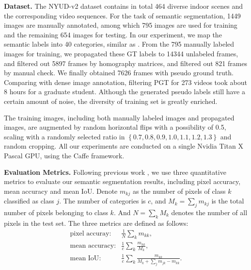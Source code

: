 \noindent\textbf{Dataset.}  
The NYUD-v2 dataset contains in total 464 diverse indoor scenes and the corresponding video sequences. 
%
For the task of semantic segmentation, 1449 images are manually annotated, among which 795 images are used for training and the remaining 654 images for testing.
%
In our experiment, we map the semantic labels into 40 categories, similar as \cite{Gupta2014}.
%
From the 795 manually labeled images for training, we propagated these GT labels to 14344 unlabeled frames, and filtered out 5897 frames by homography matrices, and filtered out 821 frames by manual check. 
We finally obtained 7626 frames with pseudo ground truth. 
%
Comparing with dense image annotation, filtering PGT for 273 videos took about 8 hours for a graduate student.
%
Although the generated pseudo labels still have a certain amount of noise, the diversity of training set is greatly enriched. 



The training images, including both manually labeled images and propagated images, are augmented by random horizontal flips with a possibility of 0.5, scaling with a randomly selected ratio in $\left\{0.7,0.8,0.9,1.0,1.1,1.2,1.3\right\}$ and random cropping. 
%
All our experiments are conducted on a single Nvidia Titan X Pascal GPU, using the Caffe framework.

\noindent\textbf{Evaluation Metrics.}  
Following previous work
\cite{Eigen2015,Gupta2014,Kendall2015,Lin2016,Lin2017,Li2016,Cheng2017,Park2017,Xu2018,Zhang2018,Jiao2018}, we use three quantitative metrics to evaluate our semantic segmentation results, including pixel accuracy, mean accuracy and mean IoU. 
Denote $m_{kj}$ as the number of pixels of class ${k}$ classified as class ${j}$.
The number of categories is $c$, and $M_{k} = \sum_{j}m_{kj}$ is the total number of pixels belonging to class $k$. 
%
And $N = \sum_{k}M_{k}$ denotes the number of all pixels in the test set.
%
The three metrics are defined as follows:
\begin{equation}\label{eq:metric}
\begin{array}{rl}
\text{pixel accuray}: &  \frac{1}{N}\sum_{k}m_{kk}, \\
\text{mean accuracy}: &\frac{1}{c}\sum_{k}\frac{m_{kk}}{M_{k}}, \\
\text{mean IoU}: &\frac{1}{c}\sum_{k}\frac{m_{kk}}{ M_{k}+\sum_{j}m_{jk}-m_{kk}}.
\end{array}
\end{equation}






